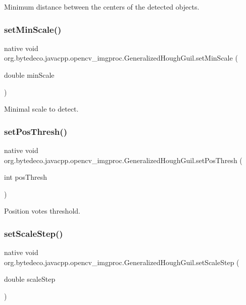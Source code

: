 Minimum distance between the centers of the detected objects. \mbox{\label{group__imgproc_gac43dc1513a83e1b7e0744411e0df313b}} 
\subsubsection{\texorpdfstring{set\+Min\+Scale()}{setMinScale()}}
{\footnotesize\ttfamily native void org.\+bytedeco.\+javacpp.\+opencv\+\_\+imgproc.\+Generalized\+Hough\+Guil.\+set\+Min\+Scale (\begin{DoxyParamCaption}\item[{double}]{min\+Scale }\end{DoxyParamCaption})}

Minimal scale to detect. \mbox{\label{group__imgproc_ga5c699f44c50f521fee2c6103fe9686a4}} 
\subsubsection{\texorpdfstring{set\+Pos\+Thresh()}{setPosThresh()}}
{\footnotesize\ttfamily native void org.\+bytedeco.\+javacpp.\+opencv\+\_\+imgproc.\+Generalized\+Hough\+Guil.\+set\+Pos\+Thresh (\begin{DoxyParamCaption}\item[{int}]{pos\+Thresh }\end{DoxyParamCaption})}

Position votes threshold. \mbox{\label{group__imgproc_gae75f4f7f0497b548ae4b9443c241f1d8}} 
\subsubsection{\texorpdfstring{set\+Scale\+Step()}{setScaleStep()}}
{\footnotesize\ttfamily native void org.\+bytedeco.\+javacpp.\+opencv\+\_\+imgproc.\+Generalized\+Hough\+Guil.\+set\+Scale\+Step (\begin{DoxyParamCaption}\item[{double}]{scale\+Step }\end{DoxyParamCaption})}

